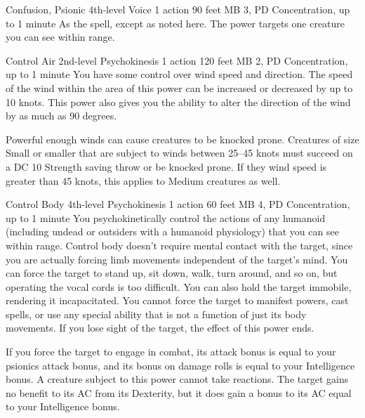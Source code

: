 \DndPowerHeader%
  {Confusion, Psionic}
  {4th-level Voice}
  {1 action}
  {90 feet}
  {MB 3, PD \lvlfour}
  {Concentration, up to 1 minute}
As the  spell, except as noted here.
The power targets one creature you can see within range.

\DndPowerHeader%
  {Control Air}
  {2nd-level Psychokinesis}
  {1 action}
  {120 feet}
  {MB 2, PD \lvltwo}
  {Concentration, up to 1 minute}
  You have some control over wind speed and direction.
  The speed of the wind within the area of this power
  can be increased or decreased by up to 10 knots.
  This power also gives you the ability to alter the direction
  of the wind by as much as 90 degrees.
  
  Powerful enough winds can cause creatures to be knocked prone.
  Creatures of size Small or smaller that are subject
  to winds between 25--45 knots
  must succeed on a DC 10 Strength saving throw or be knocked prone.
  If they wind speed is greater than 45 knots,
  this applies to Medium creatures as well.

\DndPowerHeader%
  {Control Body}
  {4th-level Psychokinesis}
  {1 action}
  {60 feet}
  {MB 4, PD \lvlfour}
  {Concentration, up to 1 minute}
  You psychokinetically control the actions of any humanoid
  (including undead or outsiders with a humanoid physiology)
  that you can see within range.
  Control body doesn't require mental contact with the target,
  since you are actually forcing limb movements independent
  of the target's mind.
  You can force the target to stand up,
  sit down,
  walk,
  turn around,
  and so on,
  but operating the vocal cords is too difficult.
  You can also hold the target immobile,
  rendering it incapacitated.
  You cannot force the target to manifest powers,
  cast spells,
  or use any special ability that is not a function
  of just its body movements.
  If you lose sight of the target,
  the effect of this power ends.

  If you force the target to engage in combat,
  its attack bonus is equal to your
  psionics attack bonus,
  and its bonus on damage rolls is equal
  to your Intelligence bonus.
  A creature subject to this power cannot take reactions.
  The target gains no benefit to its AC from its Dexterity,
  but it does gain a bonus to its AC equal to your Intelligence bonus.
  

